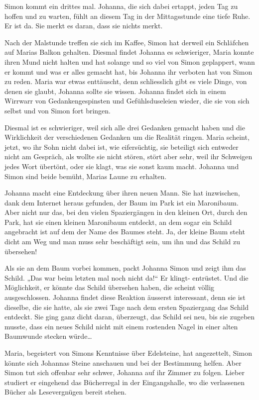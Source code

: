 \documentclass[10pt,titlepage,a5paper]{book}
\begin{document}
Simon kommt ein drittes mal. Johanna, die sich dabei ertappt, jeden Tag zu hoffen und zu warten, fühlt an diesem Tag in der Mittagsstunde eine tiefe Ruhe. Er ist da. Sie merkt es daran, dass sie nichts merkt.

Nach der Malstunde treffen sie sich im Kaffee, Simon hat derweil ein Schläfchen auf Marias Balkon gehalten. Diesmal findet Johanna es schwieriger, Maria konnte ihren Mund nicht halten und hat solange und so viel von Simon geplappert, wann er kommt und was er alles gemacht hat, bis Johanna ihr verboten hat von Simon zu reden. Maria war etwas enttäuscht, denn schliesslich gibt es viele Dinge, von denen sie glaubt, Johanna sollte sie wissen. Johanna findet sich in einem Wirrwarr von Gedankengespinsten und Gefühlsduseleien wieder, die sie von sich selbst und von Simon fort bringen. 

Diesmal ist es schwieriger, weil sich alle drei Gedanken gemacht haben und die Wirklichkeit der verschiedenen Gedanken um die Realität ringen. Maria scheint, jetzt, wo ihr Sohn nicht dabei ist, wie eifersüchtig, sie beteiligt sich entweder nicht am Gespräch, als wollte sie nicht stören, stört aber sehr, weil ihr Schweigen jedes Wort übertönt, oder sie klagt, was sie sonst kaum macht. Johanna und Simon sind beide bemüht, Marias Laune zu erhalten.

Johanna macht eine Entdeckung über ihren neuen Mann. Sie hat inzwischen, dank dem Internet heraus gefunden, der Baum im Park ist ein Maronibaum. Aber nicht nur das, bei den vielen Spazier\-gängen in den kleinen Ort, durch den Park, hat sie einen kleinen Maronibaum entdeckt, an dem sogar ein Schild angebracht ist auf dem der Name des Baumes steht. Ja, der kleine Baum steht dicht am Weg und man muss sehr beschäftigt sein, um ihn und das Schild zu übersehen!

Als sie an dem Baum vorbei kommen, packt Johanna Simon und zeigt ihm das Schild. „Das war beim letzten mal noch nicht da!“ Er klingt-{} entrüstet. Und die Möglichkeit, er könnte das Schild über\-sehen haben, die scheint völlig ausgeschlossen. Johanna findet  diese Reaktion äusserst interessant, denn sie ist dieselbe, die sie hatte, als sie zwei Tage nach dem ersten Spaziergang das Schild entdeckt. Sie ging ganz dicht daran, überzeugt, das Schild sei neu, bis sie zugeben musste, dass ein neues Schild nicht mit einem rostenden Nagel in einer alten Baumwunde stecken würde\dots 

Maria, begeistert von Simons Kenntnisse über Edelsteine, hat angezettelt, Simon könnte sich Johannas Steine anschauen und bei der Bestimmung helfen. Aber Simon tut sich offenbar sehr schwer, Johanna auf ihr Zimmer zu folgen. Lieber studiert er eingehend das Bücherregal in der Eingangshalle, wo die verlassenen Bücher als Lesevergnügen bereit stehen. 
\end{document}
